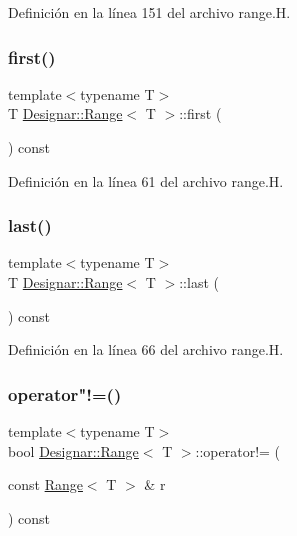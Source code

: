 Definición en la línea 151 del archivo range.\+H.

\mbox{\label{class_designar_1_1_range_a2f272a5b8100003b052a77bd48f342cd}} 
\subsubsection{\texorpdfstring{first()}{first()}}
{\footnotesize\ttfamily template$<$typename T$>$ \\
T \hyperlink{class_designar_1_1_range}{Designar\+::\+Range}$<$ T $>$\+::first (\begin{DoxyParamCaption}{ }\end{DoxyParamCaption}) const\hspace{0.3cm}{\ttfamily [inline]}}



Definición en la línea 61 del archivo range.\+H.

\mbox{\label{class_designar_1_1_range_abe2839675b48ab64073c2e74976523c7}} 
\subsubsection{\texorpdfstring{last()}{last()}}
{\footnotesize\ttfamily template$<$typename T$>$ \\
T \hyperlink{class_designar_1_1_range}{Designar\+::\+Range}$<$ T $>$\+::last (\begin{DoxyParamCaption}{ }\end{DoxyParamCaption}) const\hspace{0.3cm}{\ttfamily [inline]}}



Definición en la línea 66 del archivo range.\+H.

\mbox{\label{class_designar_1_1_range_a736b540580449acc24fd57d4fa51897e}} 
\subsubsection{\texorpdfstring{operator"!=()}{operator!=()}}
{\footnotesize\ttfamily template$<$typename T$>$ \\
bool \hyperlink{class_designar_1_1_range}{Designar\+::\+Range}$<$ T $>$\+::operator!= (\begin{DoxyParamCaption}\item[{const \hyperlink{class_designar_1_1_range}{Range}$<$ T $>$ \&}]{r }\end{DoxyParamCaption}) const\hspace{0.3cm}{\ttfamily [inline]}}



